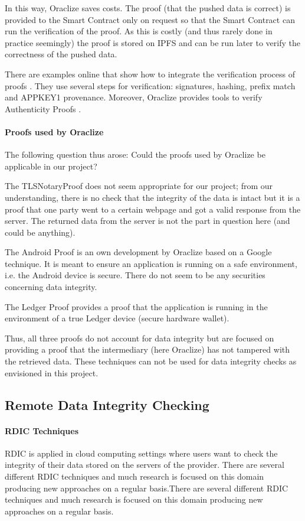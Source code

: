 In this way, Oraclize saves costs. The proof (that the pushed data is correct) is provided to the Smart Contract only on request so that the Smart Contract can run the verification of the proof. As this is costly (and thus rarely done in practice seemingly) the proof is stored on IPFS and can be run later to verify the correctness of the pushed data.

There are examples online that show how to integrate the verification process of proofs \cite{relatedWork07}. They use several steps for verification: signatures, hashing, prefix match and APPKEY1 provenance. Moreover, Oraclize provides tools to verify Authenticity Proofs \cite{relatedWork08, relatedWork09}.

\paragraph{Proofs used by Oraclize}
The following question thus arose: Could the proofs used by Oraclize be applicable in our project?

The TLSNotaryProof \cite{relatedWork10, relatedWork11, relatedWork12} does not seem appropriate for our project; from our understanding, there is no check that the integrity of the data is intact but it is a proof that one party went to a certain webpage and got a valid response from the server. The returned data from the server is not the part in question here (and could be anything).

The Android Proof \cite{relatedWork13} is an own development by Oraclize based on a Google technique. It is meant to ensure an application is running on a safe environment, i.e. the Android device is secure. There do not seem to be any securities concerning data integrity.

The Ledger Proof \cite{relatedWork14, relatedWork15} provides a proof that the application is running in the environment of a true Ledger device (secure hardware wallet).

Thus, all three proofs do not account for data integrity but are focused on providing a proof that the intermediary (here Oraclize) has not tampered with the retrieved data. These techniques can not be used for data integrity checks as envisioned in this project.

\subsection{Remote Data Integrity Checking}
\paragraph{RDIC Techniques}
RDIC is applied in cloud computing settings where users want to check the integrity of their data stored on the servers of the provider.
There are several different RDIC techniques \cite{relatedWork16} and much research is focused on this domain producing new approaches on a regular basis.There are several different RDIC techniques and much research is focused on this domain producing new approaches on a regular basis.

